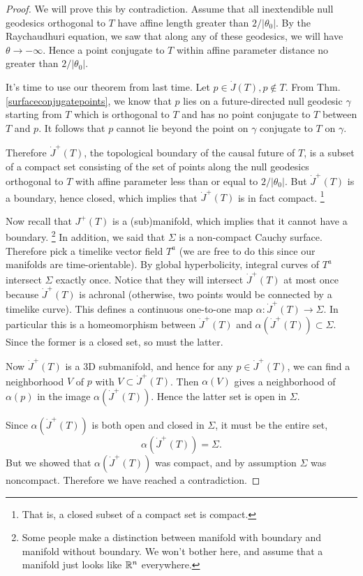 \begin{proof}
    We will prove this by contradiction. Assume that all inextendible null geodesics orthogonal to $T$ have affine length greater than $2/|\theta_0|$. By the Raychaudhuri equation, we saw that along any of these geodesics, we will have $\theta\to-\infty$. Hence a point conjugate to $T$ within affine parameter distance no greater than $2/|\theta_0|$.
    
    It's time to use our theorem from last time. Let $p\in \dot J(T), p \notin T$. From Thm. \ref{surfaceconjugatepoints}, we know that $p$ lies on a future-directed null geodesic $\gamma$ starting from $T$ which is orthogonal to $T$ and has no point conjugate to $T$ between $T$ and $p$. It follows that $p$ cannot lie beyond the point on $\gamma$ conjugate to $T$ on $\gamma$.
    
    Therefore $\dot J^+(T)$, the topological boundary of the causal future of $T$, is a subset of a compact set consisting of the set of points along the null geodesics orthogonal to $T$ with affine parameter less than or equal to $2/|\theta_0|$. But $\dot J^+(T)$ is a boundary, hence closed, which implies that $\dot J^+(T)$ is in fact compact.%
        \footnote{That is, a closed subset of a compact set is compact.}
    
    Now recall that $J^+(T)$ is a (sub)manifold, which implies that it cannot have a boundary.%
        \footnote{Some people make a distinction between manifold with boundary and manifold without boundary. We won't bother here, and assume that a manifold just looks like $\mathbb{R}^n$ everywhere.}
    In addition, we said that $\Sigma$ is a non-compact Cauchy surface. Therefore pick a timelike vector field $T^a$ (we are free to do this since our manifolds are time-orientable). By global hyperbolicity, integral curves of $T^a$ intersect $\Sigma$ exactly once. Notice that they will intersect $\dot J^+(T)$ at most once because $\dot J^+(T)$ is achronal (otherwise, two points would be connected by a timelike curve). This defines a continuous one-to-one map $\alpha:\dot J^+(T) \to \Sigma$. In particular this is a homeomorphism between $\dot J^+(T)$ and $\alpha(\dot J^+(T))\subset \Sigma$. Since the former is a closed set, so must the latter.
    
    Now $\dot J^+(T)$ is a 3D submanifold, and hence for any $p\in \dot J^+(T)$, we can find a neighborhood $V$ of $p$ with $V\subset \dot J^+(T)$. Then $\alpha(V)$ gives a neighborhood of $\alpha(p)$ in the image $\alpha(\dot J^+(T))$. Hence the latter set is open in $\Sigma$.
    
    Since $\alpha(\dot J^+(T))$ is both open and closed in $\Sigma$, it must be the entire set,
    \begin{equation*}
        \alpha(\dot J^+(T))=\Sigma.
    \end{equation*}
    But we showed that $\alpha(\dot J^+(T))$ was compact, and by assumption $\Sigma$ was noncompact. Therefore we have reached a contradiction.
\end{proof}

